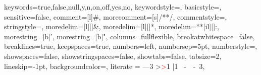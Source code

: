 \expandafter\expandafter\expandafter\lstdefinelanguage
\expandafter{\yamlLanguageName}
{
  keywords={true,false,null,y,n,on,off,yes,no},
  keywordstyle=\color{magenta}\ttfamily\footnotesize,      %
  basicstyle=\YAMLkeystyle,                                %
  sensitive=false,
  comment=[l]{\#},
  morecomment=[s]{/*}{*/},
  commentstyle=\color{codegreen}\ttfamily\footnotesize,    %
  stringstyle=\YAMLvaluestyle,                             %
  moredelim=[l][\color{orange}]{\&},
  moredelim=[l][\color{magenta}]{*},
  moredelim=**[il][\YAMLcolonstyle{:}\YAMLvaluestyle]{:},  %
  morestring=[b]',
  morestring=[b]",
  columns=fullflexible,                                    %
  breakatwhitespace=false,
  breaklines=true,
  keepspaces=true,
  numbers=left,                                            %
  numbersep=5pt,
  numberstyle=\tiny\color{codegray},                       %
  showspaces=false,
  showstringspaces=false,
  showtabs=false,
  tabsize=2,
  lineskip=-1pt,                                           %
  backgroundcolor=\color{backcolour},                      %
  literate =    {---}{{\ProcessThreeDashes}}3
                {>}{{\textcolor{red}\textgreater}}1     
                {|}{{\textcolor{red}\textbar}}1 
                {\ -\ }{{\mdseries\ -\ }}3,
}

\makeatother

\newcommand\ProcessThreeDashes{\llap{\color{cyan}\mdseries-{-}-}}

